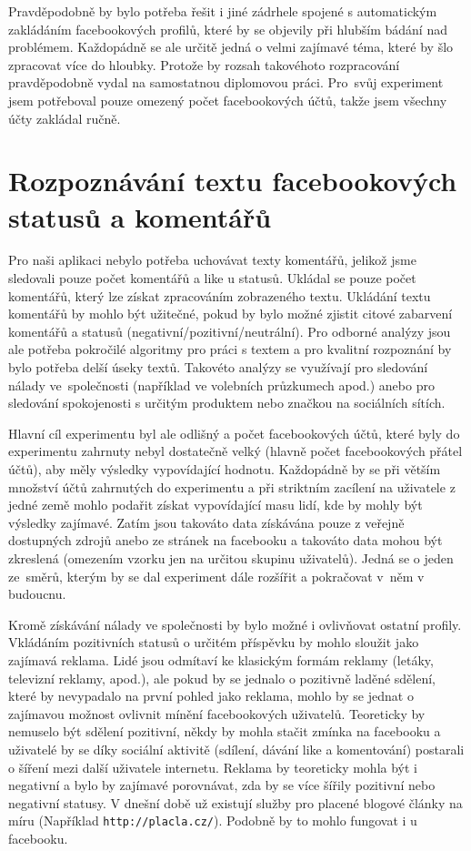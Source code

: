 \documentclass[thesis=M,czech]{FITthesis}[2013/05/10]
\begin{document}
Pravděpodobně by bylo potřeba řešit i jiné zádrhele spojené s automatickým zakládáním facebookových profilů, které by se objevily při hlubším bádání nad problémem. Každopádně se ale určitě jedná o velmi zajímavé téma, které by šlo zpracovat více do hloubky. Protože by rozsah takovéhoto rozpracování pravděpodobně vydal na samostatnou diplomovou práci. Pro~svůj experiment jsem potřeboval pouze omezený počet facebookových účtů, takže jsem všechny účty zakládal ručně.

\section{Rozpoznávání textu facebookových statusů a komentářů}

Pro naši aplikaci nebylo potřeba uchovávat texty komentářů, jelikož jsme sledovali pouze počet komentářů a like u statusů. Ukládal se pouze počet komentářů, který lze získat zpracováním zobrazeného textu. Ukládání textu komentářů by mohlo být užitečné, pokud by bylo možné zjistit citové zabarvení komentářů a statusů (negativní/pozitivní/neutrální). Pro odborné analýzy jsou ale potřeba pokročilé algoritmy pro práci s textem a pro kvalitní rozpoznání by bylo potřeba delší úseky textů. Takovéto analýzy se využívají pro sledování nálady ve~společnosti (například ve volebních průzkumech apod.) anebo pro sledování spokojenosti s určitým produktem nebo značkou na sociálních sítích. 

Hlavní cíl experimentu byl ale odlišný a počet facebookových účtů, které byly do experimentu zahrnuty nebyl dostatečně velký (hlavně počet facebookových přátel účtů), aby měly výsledky vypovídající hodnotu. Každopádně by se při větším množství účtů zahrnutých do experimentu a při striktním zacílení na uživatele z jedné země mohlo podařit získat vypovídající masu lidí, kde by mohly být výsledky zajímavé. Zatím jsou takováto data získávána pouze z veřejně dostupných zdrojů anebo ze stránek na facebooku a takováto data mohou být zkreslená (omezením vzorku jen na určitou skupinu uživatelů). Jedná se o jeden ze~směrů, kterým by se dal experiment dále rozšířit a pokračovat v~něm v budoucnu.

Kromě získávání nálady ve společnosti by bylo možné i ovlivňovat ostatní profily. Vkládáním pozitivních statusů o určitém příspěvku by mohlo sloužit jako zajímavá reklama. Lidé jsou odmítaví ke klasickým formám reklamy (letáky, televizní reklamy, apod.), ale pokud by se jednalo o pozitivně laděné sdělení, které by nevypadalo na první pohled jako reklama, mohlo by se jednat o zajímavou možnost ovlivnit mínění facebookových uživatelů. Teoreticky by nemuselo být sdělení pozitivní, někdy by mohla stačit zmínka na facebooku a uživatelé by se díky sociální aktivitě (sdílení, dávání like a komentování) postarali o šíření mezi další uživatele internetu. Reklama by teoreticky mohla být i negativní a bylo by zajímavé porovnávat, zda by se více šířily pozitivní nebo negativní statusy. V dnešní době už existují služby pro placené blogové články na míru (Například \verb|http://placla.cz/|). Podobně by to mohlo fungovat i u facebooku.
\end{document}
